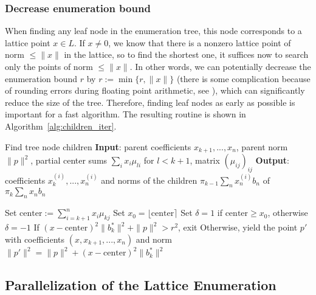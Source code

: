 \documentclass{scrartcl}
\begin{document}
    \subsubsection*{Decrease enumeration bound}

    \label{sec:enum_bound}
    When finding any leaf node in the enumeration tree, this node corresponds to a lattice point $x \in L$. 
    If $x \neq 0$, we know that there is a nonzero lattice point of norm $\leq \|x\|$ in the lattice, so to find the shortest one, it suffices now to search only the points of norm $\leq \|x\|$. 
    In other words, we can potentially decrease the enumeration bound $r$ by $r := \min \{ r, \|x\| \}$ (there is some complication because of rounding errors during floating point arithmetic, see \cite{enum_numerics}), which can significantly reduce the size of the tree. 
    Therefore, finding leaf nodes as early as possible is important for a fast algorithm.
    The resulting routine is shown in Algorithm~\ref{alg:children_iter}.

    \begin{algorithm}
        \caption{
            Find tree node children \label{alg:children_iter}
            \newline
            \textbf{Input}: parent coefficients $x_{k + 1}, ..., x_n$, parent norm $\|p\|^2$, partial center sums $\sum_i x_i \mu_{li}$ for $l < k + 1$, matrix $(\mu_{ij})_{ij}$
            \newline
            \textbf{Output}: coefficients $x^{(i)}_k, ..., x^{(i)}_n$ and norms of the children $\pi_{k - 1} \sum_n x_n^{(i)}b_n$ of $\pi_k \sum_n x_n b_n$
        }
        \begin{algorithmic}
            \STATE Set $\mathrm{center} := \sum_{i = k + 1}^n x_i \mu_{kj}$
            \STATE Set $x_0 = \lfloor \mathrm{center} \rceil$
            \STATE Set $\delta = 1$ if $\mathrm{center} \geq x_0$, otherwise $\delta = -1$
                \STATE If $(x - \mathrm{center})^2 \| b^*_k \|^2 + \| p \|^2 > r^2$, exit
                \STATE Otherwise, yield the point $p'$ with coefficients $(x, x_{k + 1}, ..., x_n)$ and norm $\|p'\|^2 = \|p\|^2 + (x - \mathrm{center})^2 \|b_k^*\|^2$
            \ENDFOR
        \end{algorithmic}
    \end{algorithm}

    \subsection{Parallelization of the Lattice Enumeration}
\end{document}
